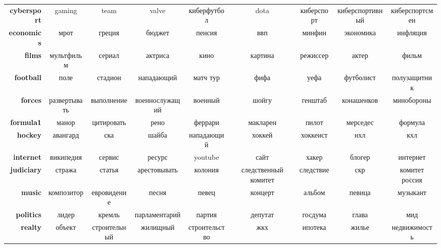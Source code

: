 \documentclass[a4paper, 14pt]{extarticle}
\begin{document}
\begin{table}
{\begin{tabular}{r|cccccccc}
			\textbf{cybersport}      &             gaming &            team &              valve &           киберфутбол &                  dota &     киберспорт &  киберспортивный &  киберспортсмен \\
			\textbf{economics}       &               мрот &          греция &             бюджет &                пенсия &                   ввп &         минфин &        экономика &        инфляция \\
			\textbf{films}           &         мультфильм &          сериал &            актриса &                  кино &               картина &       режиссер &            актер &           фильм \\
			\textbf{football}        &               поле &         стадион &         нападающий &              матч тур &                  фифа &           уефа &        футболист &    полузащитник \\
			\textbf{forces}          &       развертывать &      выполнение &     военнослужащий &               военный &                 шойгу &        генштаб &       конашенков &      минобороны \\
			\textbf{formula1}        &              манор &      цитировать &               рено &               феррари &              макларен &          пилот &         мерседес &         формула \\
			\textbf{hockey}          &           авангард &             ска &              шайба &            нападающий &                хоккей &       хоккеист &              нхл &             кхл \\
			\textbf{internet}        &          википедия &          сервис &             ресурс &               youtube &                  сайт &          хакер &           блогер &        интернет \\
			\textbf{judiciary}       &             стража &          статья &       арестовывать &               колония &  следственный комитет &      следствие &              скр &  комитет россия \\
			\textbf{music}           &         композитор &     евровидение &              песня &                 певец &               концерт &         альбом &           певица &        музыкант \\
			\textbf{politics}        &              лидер &          кремль &      парламентарий &                партия &               депутат &        госдума &            глава &             мид \\
			\textbf{realty}          &             объект &    строительный &           жилищный &         строительство &                   жкх &        ипотека &            жилье &    недвижимость \\

\end{tabular}}
\end{table}
\end{document}
